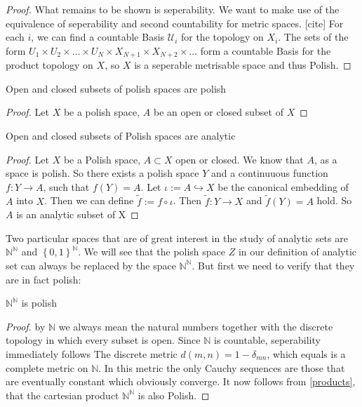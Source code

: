 \documentclass[10pt, a4paper, titlepage]{article}
\numberwithin{equation}{section}
\begin{document}
\begin{proof}
What remains to be shown is seperability. We want to make use of the equivalence of seperability and second countability for metric spaces. [cite]
For each $i$, we can find a countable Basis  $\mathcal{U}_i$ for the topology on $X_i$.
The sets of the form $U_1 \times U_2 \times \ldots \times U_N \times X_{N+1} \times X_{N+2} \times \ldots$ form a countable Basis for the product topology on $X$, 
so  $X$ is a seperable metrisable space and thus Polish.

\end{proof}

\begin{corollary}
	Open and closed subsets of polish spaces are polish
\end{corollary}


\begin{proof}
	Let $X$ be a polish space, $A$ be an open or closed subset of $X$
\end{proof}


\begin{theorem}
	Open and closed subsets of Polish spaces are analytic
\end{theorem}

\begin{proof}
	Let $X$ be a Polish space, $A \subset X$ open or closed.
	We know that $A$, as a space is polish. So there exists a polish space $Y$ and a continuuous function  $f:Y\to A$, such that  $f(Y) = A$. 
	Let $\iota := A \hookrightarrow X$ be the canonical embedding of  $A$ into  $X$. 
	Then we can define  $\tilde{f} := f \circ \iota$. Then  $\tilde{f}:Y \to X $ and  $\tilde{f}(Y) = A$ hold. So  $A$ is an analytic subset of X


\end{proof}

Two particular spaces that are of great interest in the study of analytic sets are $\mathbb{N}^{\mathbb{N}}$ and $\left\{ 0,1 \right\}^{\mathbb{N}} $.
We will see that the polish space $Z$ in our definition of analytic set can always be replaced by the space $\mathbb{N}^{\mathbb{N}}$. But first we need to verify that they are in fact polish:

\begin{theorem}
	$\mathbb{N}^\mathbb{N}$ is polish
\end{theorem}
\begin{proof}
	by $\mathbb{N}$ we always mean the natural numbers together with the discrete topology in which every subset is open. Since $\mathbb{N}$ is countable, seperability immediately follows
	The discrete metric $d\left( m,n \right) = 1 - \delta_{mn} $, which equals is a complete metric on  $\mathbb{N}$.
	In this metric the only Cauchy sequences are those that are eventually constant which obviously converge.
	It now follows from \ref{products}, that the cartesian product $\mathbb{N}^{\mathbb{N}}$ is also Polish.
\end{proof}
\end{document}
